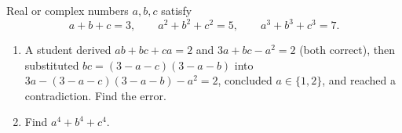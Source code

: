 Real or complex numbers \(a,b,c\) satisfy
\[
a+b+c=3,\qquad a^2+b^2+c^2=5,\qquad a^3+b^3+c^3=7.
\]
\begin{enumerate}
\item[(a)] A student derived \(ab+bc+ca=2\) and \(3a+bc-a^2=2\) (both correct), then substituted \(bc=(3-a-c)(3-a-b)\) into \(3a-(3-a-c)(3-a-b)-a^2=2\), concluded \(a\in\{1,2\}\), and reached a contradiction. Find the error.
\item[(b)] Find \(a^4+b^4+c^4\).
\end{enumerate}
